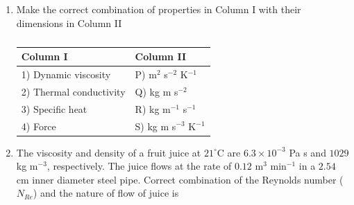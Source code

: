 \documentclass[a4paper,10pt]{article}
\begin{document}
\begin{enumerate}
    \hfill{}
    
    \item Make the correct combination of properties in Column I with their dimensions in Column II
    \begin{table}[h!] \centering \caption*{} \label{tab:q18_food}
        \begin{tabular}{ll} \hline
            \textbf{Column I} & \textbf{Column II} \\ \hline
            1) Dynamic viscosity & P) m$^2$ s$^{-2}$ K$^{-1}$ \\
            2) Thermal conductivity & Q) kg m s$^{-2}$ \\
            3) Specific heat & R) kg m$^{-1}$ s$^{-1}$ \\
            4) Force & S) kg m s$^{-3}$ K$^{-1}$ \\ \hline
        \end{tabular}
    \end{table}
    
    \hfill{}
    \begin{enumerate}
    \end{enumerate}
    
    \item The viscosity and density of a fruit juice at $21^\circ$C are $6.3 \times 10^{-3}$ Pa s and $1029$ kg m$^{-3}$, respectively. The juice flows at the rate of $0.12$ m$^3$ min$^{-1}$ in a $2.54$ cm inner diameter steel pipe. Correct combination of the Reynolds number ($N_{Re}$) and the nature of flow of juice is
    
    \hfill{}
    \begin{enumerate}
    \end{enumerate}
    

\end{enumerate}
\end{document}
